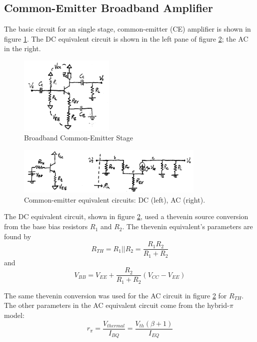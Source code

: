 \documentclass[titlepage, letterpaper, 11pt]{article}
\begin{document}
\subsection{Common-Emitter Broadband Amplifier}

The basic circuit for an single stage, common-emitter (CE)
amplifier is shown in figure \ref{commonEmitterAmplifier}.
The DC equivalent circuit is shown in the left pane of figure
\ref{commonEmitterEquivalentCircuits}; the AC in the right.

\begin{figure}[ht]
	\centering
	\includegraphics[width=0.4\textwidth]
		{figures/commonEmitterAmplifier.png}
	\caption{
		Broadband Common-Emitter Stage
	}
	\label{commonEmitterAmplifier}
\end{figure}

\begin{figure}[ht]
	\centering
	\includegraphics[width=0.8\textwidth]
		{figures/commonEmitterEquivalentCircuits}
	\caption{
		Common-emitter equivalent circuits: DC (left),
		AC (right).
	}
	\label{commonEmitterEquivalentCircuits}
\end{figure}

The DC equivalent circuit, shown in figure
\ref{commonEmitterEquivalentCircuits}, used a thevenin source
conversion from the base bias resistors $R_{1}$ and $R_{2}$. The
thevenin equivalent's parameters are found by
\begin{equation}
R_{TH}=R_{1}||R_{2}=\frac{R_{1}R_{2}}{R_{1}+R_{2}}
\end{equation}
and
\begin{equation}
V_{BB}=V_{EE}+\frac{R_{2}}{R_{1}+R_{2}}(V_{CC}-V_{EE})
\end{equation}

The same thevenin conversion was used for the AC circuit in figure
\ref{commonEmitterEquivalentCircuits} for $R_{TH}$. The other
parameters in the AC equivalent circuit come from the hybrid-$\pi$
model:
\begin{equation}
r_{\pi}=\frac{V_{thermal}}{I_{BQ}}=\frac{V_{th}(\beta+1)}{I_{EQ}}
\label{rPiEq}
\end{equation}
\end{document}
